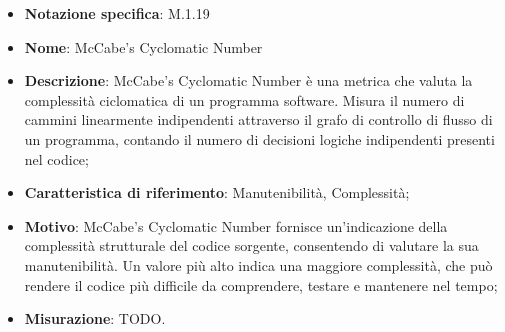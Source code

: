 \begin{itemize}
    \item \textbf{Notazione specifica}: M.1.19
    \item \textbf{Nome}: McCabe’s Cyclomatic Number
    \item \textbf{Descrizione}: McCabe’s Cyclomatic Number è una metrica che valuta la complessità ciclomatica di un programma software. Misura il numero di cammini linearmente indipendenti attraverso il grafo di controllo di flusso di un programma, contando il numero di decisioni logiche indipendenti presenti nel codice;
    \item \textbf{Caratteristica di riferimento}: Manutenibilità, Complessità;
    \item \textbf{Motivo}: McCabe’s Cyclomatic Number fornisce un'indicazione della complessità strutturale del codice sorgente, consentendo di valutare la sua manutenibilità. Un valore più alto indica una maggiore complessità, che può rendere il codice più difficile da comprendere, testare e mantenere nel tempo;
    \item \textbf{Misurazione}: TODO.
\end{itemize}
